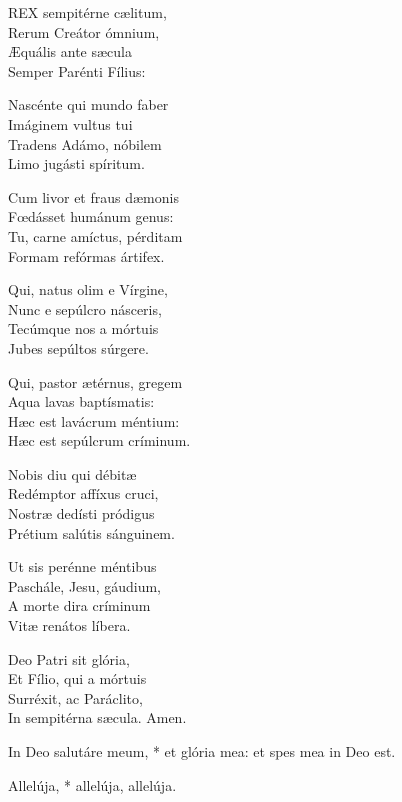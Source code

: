 
\lettrine[lines=2]{R}{EX} sempitérne cælitum,\\
Rerum Creátor ómnium,\\
Æquális ante sæcula\\
Semper Parénti Fílius:

Nascénte qui mundo faber\\
Imáginem vultus tui\\
Tradens Adámo, nóbilem\\
Limo jugásti spíritum.

Cum livor et fraus dæmonis\\
Fœdásset humánum genus:\\
Tu, carne amíctus, pérditam\\
Formam refórmas ártifex.

Qui, natus olim e Vírgine,\\
Nunc e sepúlcro násceris,\\
Tecúmque nos a mórtuis\\
Jubes sepúltos súrgere.

Qui, pastor ætérnus, gregem\\
Aqua lavas baptísmatis:\\
Hæc est lavácrum méntium:\\
Hæc est sepúlcrum críminum.

Nobis diu qui débitæ\\
Redémptor affíxus cruci,\\
Nostræ dedísti pródigus\\
Prétium salútis sánguinem.

Ut sis perénne méntibus\\
Paschále, Jesu, gáudium,\\
A morte dira críminum\\
Vitæ renátos líbera.

Deo Patri sit glória,\\
Et Fílio, qui a mórtuis\\
Surréxit, ac Paráclito,\\
In sempitérna sæcula. Amen.



 In Deo salutáre meum, * et glória mea: et spes mea in Deo est.


 Allelúja, * allelúja, allelúja.

